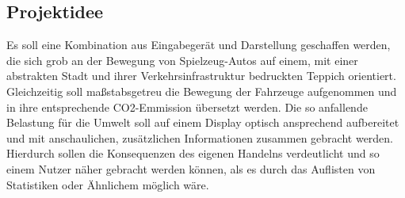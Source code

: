 \documentclass[.../Dokumentation.tex]{subfiles}
\begin{document}
\subsection{Projektidee}\label{sec-intr-idea}
Es soll eine Kombination aus Eingabegerät und Darstellung geschaffen werden, 
die sich grob an der Bewegung von Spielzeug-Autos auf einem, 
mit einer abstrakten Stadt und ihrer Verkehrsinfrastruktur bedruckten Teppich 
orientiert. Gleichzeitig soll maßstabsgetreu die Bewegung der Fahrzeuge 
aufgenommen und in ihre entsprechende CO2-Emmission übersetzt werden. 
Die so anfallende Belastung für die Umwelt soll auf einem Display 
optisch ansprechend aufbereitet und mit anschaulichen, zusätzlichen 
Informationen zusammen gebracht werden. 
Hierdurch sollen die Konsequenzen des eigenen Handelns verdeutlicht 
und so einem Nutzer näher gebracht werden können, als es durch das 
Auflisten von Statistiken oder Ähnlichem möglich wäre.
\end{document}
